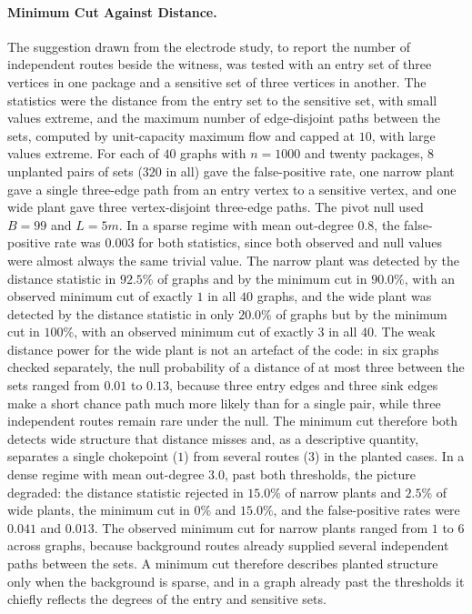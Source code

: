 \documentclass[11pt]{article}
\begin{document}
\paragraph{Minimum Cut Against Distance.} The suggestion drawn from the electrode study, to report the number of independent routes beside the witness, was tested with an entry set of three vertices in one package and a sensitive set of three vertices in another. The statistics were the distance from the entry set to the sensitive set, with small values extreme, and the maximum number of edge-disjoint paths between the sets, computed by unit-capacity maximum flow and capped at $10$, with large values extreme. For each of $40$ graphs with $n=1000$ and twenty packages, $8$ unplanted pairs of sets ($320$ in all) gave the false-positive rate, one narrow plant gave a single three-edge path from an entry vertex to a sensitive vertex, and one wide plant gave three vertex-disjoint three-edge paths. The pivot null used $B=99$ and $L=5m$. In a sparse regime with mean out-degree $0.8$, the false-positive rate was $0.003$ for both statistics, since both observed and null values were almost always the same trivial value. The narrow plant was detected by the distance statistic in $92.5\%$ of graphs and by the minimum cut in $90.0\%$, with an observed minimum cut of exactly $1$ in all $40$ graphs, and the wide plant was detected by the distance statistic in only $20.0\%$ of graphs but by the minimum cut in $100\%$, with an observed minimum cut of exactly $3$ in all $40$. The weak distance power for the wide plant is not an artefact of the code: in six graphs checked separately, the null probability of a distance of at most three between the sets ranged from $0.01$ to $0.13$, because three entry edges and three sink edges make a short chance path much more likely than for a single pair, while three independent routes remain rare under the null. The minimum cut therefore both detects wide structure that distance misses and, as a descriptive quantity, separates a single chokepoint ($1$) from several routes ($3$) in the planted cases. In a dense regime with mean out-degree $3.0$, past both thresholds, the picture degraded: the distance statistic rejected in $15.0\%$ of narrow plants and $2.5\%$ of wide plants, the minimum cut in $0\%$ and $15.0\%$, and the false-positive rates were $0.041$ and $0.013$. The observed minimum cut for narrow plants ranged from $1$ to $6$ across graphs, because background routes already supplied several independent paths between the sets. A minimum cut therefore describes planted structure only when the background is sparse, and in a graph already past the thresholds it chiefly reflects the degrees of the entry and sensitive sets.
\end{document}
